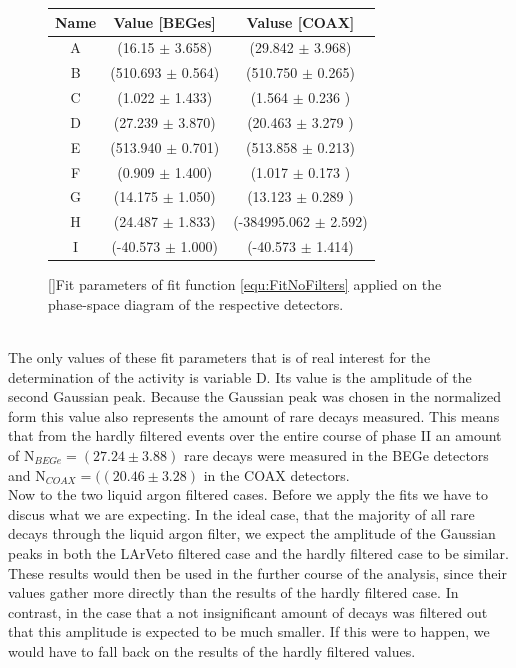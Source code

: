 \begin{figure}[t!]
\centering
\begin{tabular}{|c|c|c|}
\hline
Name	& Value [BEGes] & Valuse [COAX]\\ 
\hline
A  &	(16.15 \(\pm\)	3.658)&	(29.842 \(\pm\)	3.968)	\\	
\hline
B  &	(510.693 \(\pm\)	0.564)&	(510.750 \(\pm\)	0.265)\\	
\hline
C  &	(1.022 \(\pm\)	1.433)	&	(1.564 \(\pm\)	0.236	)	\\
\hline
D  &	(27.239 \(\pm\)	3.870)	&	(20.463 \(\pm\)	3.279	)	\\
\hline
E  &	(513.940 \(\pm\)	0.701)	&	(513.858 \(\pm\)	0.213)	\\
\hline
F  &	(0.909 \(\pm\)	1.400)	&	(1.017 \(\pm\)	0.173	)	\\
\hline
G  &	(14.175 \(\pm\)	1.050)	&	(13.123 \(\pm\)	0.289	)	\\
\hline
H  &	(24.487 \(\pm\)	1.833)	&	(-384995.062 \(\pm\)	2.592)	\\
\hline
I  &	(-40.573 \(\pm\) 1.000)	&	(-40.573 \(\pm\)	1.414)\\
\hline

\end{tabular}
\label{tab:FitParNoFilter}
[]{Fit parameters of fit function \ref{equ:FitNoFilters} applied on the phase-space diagram of the respective detectors.}
\end{figure}
\\

The only values of these fit parameters that is of real interest for the determination of the activity is variable D.
Its value is the amplitude of the second Gaussian peak.
Because the Gaussian peak was chosen in the normalized form this value also represents the amount of rare  decays measured.
This means that from the hardly filtered events over the entire course of phase II an amount of $\mathrm{N}_{BEGe} = (27.24\pm3.88)$ rare  decays were measured in the BEGe detectors and $\mathrm{N}_{COAX} = ((20.46\pm3.28)$ in the COAX detectors. 
\\

Now to the two liquid argon filtered cases.
Before we apply the fits we have to discus what we are expecting.
In the ideal case, that the majority of all rare  decays through the liquid argon filter, we expect the amplitude of the Gaussian peaks in both the LArVeto filtered case and the hardly filtered case to be similar.
These results would then be used in the further course of the analysis, since their values gather more directly than the results of the hardly filtered case.
In contrast, in the case that a not insignificant amount of  decays was filtered out that this amplitude is expected to be much smaller.
If this were to happen, we would have to fall back on the results of the hardly filtered values.
\\

